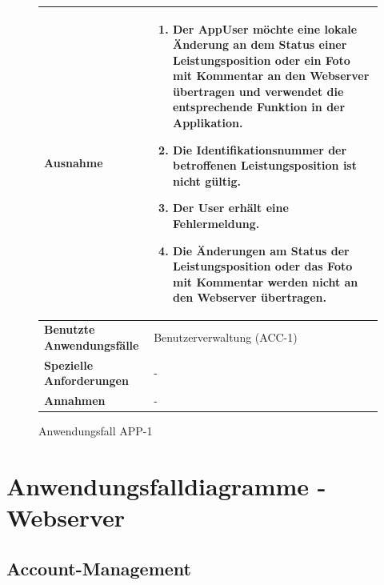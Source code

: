 			\begin{figure}[h]
	\centering
	\begin{tabularx}{\textwidth}{ X | X }
						\textbf{Ausnahme} &
				\begin{enumerate}
					 \item Der AppUser m\"ochte eine lokale \"Anderung an dem Status einer Leistungsposition oder ein Foto mit Kommentar an den Webserver \"ubertragen und verwendet die entsprechende Funktion in der Applikation. 
					 \item Die Identifikationsnummer der betroffenen Leistungsposition ist nicht g\"ultig.
					 \item Der User erh\"alt eine Fehlermeldung.
					 \item Die \"Anderungen am Status der Leistungsposition oder das Foto mit Kommentar werden nicht an den Webserver \"ubertragen.
				\end{enumerate} \\ \hline
		\textbf{Benutzte Anwendungsfälle} & Benutzerverwaltung (ACC-1) \\ \hline
		\textbf{Spezielle Anforderungen} & - \\ \hline
		\textbf{Annahmen} & -
	\end{tabularx}
	\caption{Anwendungsfall APP-1}
	\label{fig:anwendungsfall-app-tabelle-APP-1-4}
\end{figure}

\clearpage

\section{Anwendungsfalldiagramme - Webserver}

\subsection{Account-Management}

